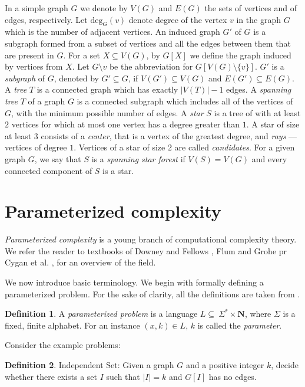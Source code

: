 \documentclass[en]{pracamgr}
\theoremstyle{definition}
\newtheorem{definition}{Definition}
\newcommand{\ssf}{spanning star forest}
\newcommand{\indset}{{\sc Independent Set}}
\newcommand{\degree}[2]{\textrm{deg}_{#1}(#2)}
\begin{document}
In a simple graph $G$ we denote by $V(G)$ and $E(G)$ the sets of vertices and of edges, respectively. 
Let $\degree{G}{v}$ denote degree of the vertex $v$ in the graph $G$ which is the number of adjacent vertices. 
An induced graph $G'$ of $G$ is a subgraph formed from a subset of vertices and all the edges between them that are present in $G$. 
For a set $X \subseteq V(G)$, by $G[X]$ we define the graph induced by vertices from $X$. 
Let $G \setminus v$ be the abbreviation for $G[V(G) \setminus \{v\}]$.
$G'$ is a \emph{subgraph} of $G$, denoted by $G' \subseteq G$, if $V(G') \subseteq V(G)$ and $E(G') \subseteq E(G)$.
A \emph{tree} $T$ is a connected graph which has exactly $|V(T)|-1$ edges. 
A \emph{spanning tree} $T$ of a graph $G$ is a connected subgraph which includes all of the vertices of $G$, with the minimum possible number of edges.
A \emph{star} $S$ is a tree of with at least $2$ vertices for which at most one vertex has a degree greater than $1$. 
A star of size at least $3$ consists of a \emph{center}, that is a vertex of the greatest degree, and \emph{rays} --- vertices of degree $1$. 
Vertices of a star of size 2 are called \emph{candidates}.
For a given graph $G$, we say that $S$ is a \emph{\ssf{}} if $V(S)=V(G)$ and every connected component of $S$ is a star.

\section{Parameterized complexity}

\emph{Parameterized complexity} is a young branch of computational complexity theory. We refer the reader to textbooks of Downey and Fellows \cite{ParComp}, Flum and Grohe \cite{ParCompThm} pr Cygan et al. \cite{ParAlg}, for an overview of the field.

We now introduce basic terminology. We begin with formally defining a parameterized problem. For the sake of clarity, all the definitions are taken from \cite{ParAlg}.

\begin{definition}\label{Parameterized problem}
	A \textit{parameterized problem} is a language $L \subseteq \ \Sigma^* \times \mathbf{N}$, where $\Sigma$ is a fixed, finite alphabet. For an instance $(x,k) \in L$, $k$ is called the \textit{parameter}.
\end{definition}

\noindent
Consider the example problems:

\begin{definition}
	\indset{}: Given a graph $G$ and a positive integer $k$, decide whether there exists a set $I$ such that $|I|=k$ and $G[I]$ has no edges.
\end{definition}
\end{document}
